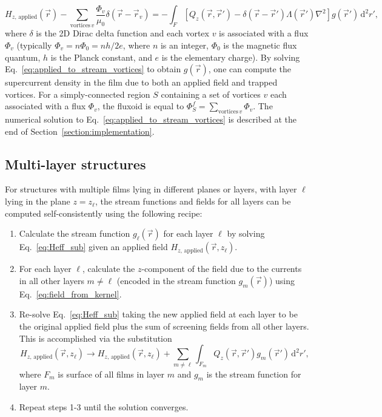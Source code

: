 \documentclass[final,3p,times]{elsarticle}
\newcounter{bla}
\begin{document}
\begin{equation}
    \label{eq:applied_to_stream_vortices}
    H_{z,\,\mathrm{applied}}(\vec{r}) - \sum_{\mathrm{vortices}\,v}\frac{\Phi_v}{\mu_0}\delta(\vec{r}-\vec{r}_v)
    = -\int_F\left[
        Q_z(\vec{r},\vec{r}')-\delta(\vec{r}-\vec{r}')\Lambda(\vec{r}')\nabla^2\right
    ]g(\vec{r}')\,\mathrm{d}^2r',
\end{equation}
where $\delta$ is the 2D Dirac delta function and each vortex $v$ is associated with a flux $\Phi_v$ (typically $\Phi_v=n\Phi_0=nh/2e$, where $n$ is an integer, $\Phi_0$ is the magnetic flux quantum, $h$ is the Planck constant, and $e$ is the elementary charge). By solving Eq.~\ref{eq:applied_to_stream_vortices} to obtain $g(\vec{r})$, one can compute the supercurrent density in the film due to both an applied field and trapped vortices. For a simply-connected region $S$ containing a set of vortices $v$ each associated with a flux $\Phi_v$, the fluxoid is equal to $\Phi^f_S=\sum_{\mathrm{vortices}\,v}\Phi_v$. The numerical solution to Eq.~\ref{eq:applied_to_stream_vortices} is described at the end of Section~\ref{section:implementation}.

\subsection{Multi-layer structures}
\label{section:model:multilayer}

For structures with multiple films lying in different planes or layers, with layer $\ell$ lying in the plane $z=z_\ell$,
the stream functions and fields for all layers can be computed self-consistently using the following recipe:

\begin{enumerate}
    \item{
        Calculate the stream function $g_\ell(\vec{r})$ for each layer $\ell$ by solving Eq.~\ref{eq:Heff_sub} given an applied field $H_{z,\,\mathrm{applied}}(\vec{r}, z_\ell)$.
    }
    \item{
        For each layer $\ell$, calculate the $z$-component of the field due to the currents in all other layers $m\neq\ell$ (encoded in the stream function $g_m(\vec{r})$)
        using Eq.~\ref{eq:field_from_kernel}.
    }
    \item{
        Re-solve Eq.~\ref{eq:Heff_sub} taking the new applied field at each layer to be the original applied field plus the sum of screening fields from all other layers. This is accomplished via the substitution
        $$
            H_{z,\,\mathrm{applied}}(\vec{r}, z_\ell) \to
            H_{z,\,\mathrm{applied}}(\vec{r}, z_\ell)
            + \sum_{m\neq\ell}
            \int_{F_m} Q_z(\vec{r},\vec{r}')g_m(\vec{r}')\,\mathrm{d}^2r',
        $$
        where $F_m$ is surface of all films in layer $m$ and $g_m$ is the stream function for layer $m$.
    }
    \item{
        Repeat steps 1-3 until the solution converges.
    }
\end{enumerate}
\end{document}
